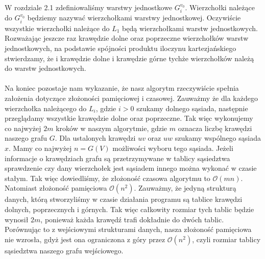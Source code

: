 \documentclass[12pt,a4paper,titlepage]{article}
\begin{document}
W rozdziale 2.1 zdefiniowaliśmy warstwy jednostkowe $G_i ^{v_0}$. Wierzchołki należące do $G_i ^{v_0}$ będziemy nazywać wierzchołkami warstwy jednostkowej. Oczywiście wszystkie wierzchołki należące do $L_1$ będą wierzchołkami warstw jednostkowych.\\
Rozważając jeszcze raz krawędzie dolne oraz poprzeczne wierzchołków warstw jednostkowych, na podstawie spójności produktu iloczynu kartezjańskiego stwierdzamy, że i krawędzie dolne i krawędzie górne tychże wierzchołków należą do warstw jednostkowych.\\
\\
Na koniec pozostaje nam wykazanie, że nasz algorytm rzeczywiście spełnia założenia dotyczące złożoności pamięciowej i czasowej. Zauważmy że dla każdego wierzchołka należącego do $L_i$, gdzie $i>0$ szukamy dolnego sąsiada, następnie przeglądamy wszystkie krawędzie dolne oraz poprzeczne. Tak więc wykonujemy co najwyżej $2m$ kroków w naszym algorytmie, gdzie $m$ oznacza liczbę krawędzi naszego grafu $G$. Dla ustalonych krawędzi $uv$ oraz $uw$ szukamy wspólnego sąsiada $x$. Mamy co najwyżej $n=G(V)$ możliwości wyboru tego sąsiada. Jeżeli informacje o krawędziach grafu są przetrzymywane w tablicy sąsiedztwa sprawdzenie czy dany wierzchołek jest sąsiadem innego można wykonać w czasie stałym. Tak więc dowiedliśmy, że złożoność czasowa algorytmu to $\mathcal{O}(mn)$. Natomiast złożoność pamięciowa $\mathcal{O}(n^2)$. Zauważmy, że jedyną strukturą danych, którą stworzyliśmy w czasie działania programu są tablice krawędzi dolnych, poprzecznych i górnych. Tak więc całkowity rozmiar tych tablic będzie wynosił $2m$, ponieważ każda krawędź trafi dokładnie do dwóch tablic. Porównując to z wejściowymi strukturami danych, nasza złożoność pamięciowa nie wzrosła, gdyż jest ona ograniczona z góry przez $\mathcal{O}(n^2)$, czyli rozmiar tablicy sąsiedztwa naszego grafu wejściowego. \\
\end{document}
